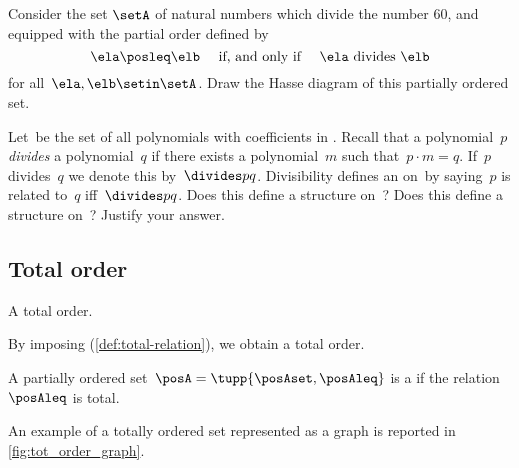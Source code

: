 \begin{gradedexercise}
    Consider the set $\setA$ of natural numbers which divide the number 60, and equipped with the partial order defined by
    \begin{equation}
        \ela \posleq \elb \quad \text{ if, and only if } \quad \ela \text{ divides } \elb
    \end{equation}
    for all~$\ela, \elb \setin \setA$.
    Draw the Hasse diagram of this partially ordered set.
\end{gradedexercise}

\begin{gradedexercise}
    \label{ex:PolynomialDivisibility}
    Let~\setA be the set of all polynomials with coefficients in \reals.
    Recall that a polynomial~$p$ \emph{divides} a polynomial~$q$ if there exists a polynomial~$m$ such that~$p \cdot m = q$.
    If~$p$ divides~$q$ we denote this by~$\divides p q$.
    Divisibility defines an  on~\setA by saying~$p$ is related to~$q$ iff~$\divides p q$.
    Does this define a  structure on~\setA?
    Does this define a  structure on~\setA?
    Justify your answer.
\end{gradedexercise}

\vfill

\subsection{Total order}

\begin{marginfigure}
    \centering
    \caption{A total order.}
    \label{fig:tot_order_graph}
\end{marginfigure}
By imposing \emph{} (\cref{def:total-relation}), we obtain a total order.

\begin{ctdefinition}
    \label{def:total-order}
    A partially ordered set~$\posA = \tupp{\posAset,\posAleq}$ is a  if the relation~$\posAleq$ is total.
\end{ctdefinition}

An example of a totally ordered set represented as a graph is reported in \cref{fig:tot_order_graph}.

